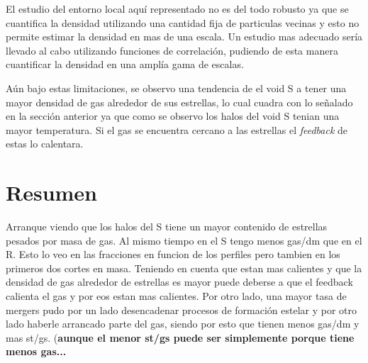 El estudio del entorno local aqu\'i representado no es del todo robusto ya que se cuantifica la densidad utilizando una cantidad fija de particulas vecinas y esto no permite estimar la densidad en mas de una escala. Un estudio mas adecuado ser\'ia llevado al cabo utilizando funciones de correlaci\'on, pudiendo de esta manera cuantificar la densidad en una ampl\'ia gama de escalas. 

A\'un bajo estas limitaciones, se observo una tendencia de el void S a tener una mayor densidad de gas alrededor de sus estrellas, lo cual cuadra con lo se\~nalado en la secci\'on anterior ya que como se observo los halos del void S tenian una mayor temperatura. Si el gas se encuentra cercano a las estrellas el \textit{feedback} de estas lo calentara. 

\section{Resumen}
Arranque viendo que los halos del S tiene un mayor contenido de estrellas pesados por masa de gas. Al mismo tiempo en el S tengo menos gas/dm que en el R. Esto lo veo en las fracciones en funcion de los perfiles pero tambien en los primeros dos cortes en masa. Teniendo en cuenta que estan mas calientes y que la densidad de gas alrededor de estrellas es mayor puede deberse a que el feedback calienta el gas y por eos estan mas calientes. Por otro lado, una mayor tasa de mergers pudo por un lado desencadenar procesos de formaci\'on estelar y por otro lado haberle arrancado parte del gas, siendo por esto que tienen menos gas/dm y mas st/gs. (\textbf{aunque el menor st/gs puede ser simplemente porque tiene menos gas...}